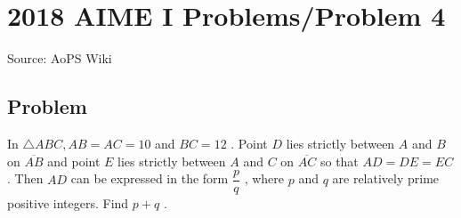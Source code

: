 \documentclass[12pt]{article}
\begin{document}
\section*{{2018 AIME I Problems/Problem 4}}
Source: AoPS Wiki

\subsection*{Problem}
In $\triangle ABC, AB = AC = 10$ and $BC = 12$ . Point $D$ lies strictly between $A$ and $B$ on $\overline{AB}$ and point $E$ lies strictly between $A$ and $C$ on $\overline{AC}$ so that $AD = DE = EC$ . Then $AD$ can be expressed in the form $\dfrac{p}{q}$ , where $p$ and $q$ are relatively prime positive integers. Find $p+q$ .
\end{document}

